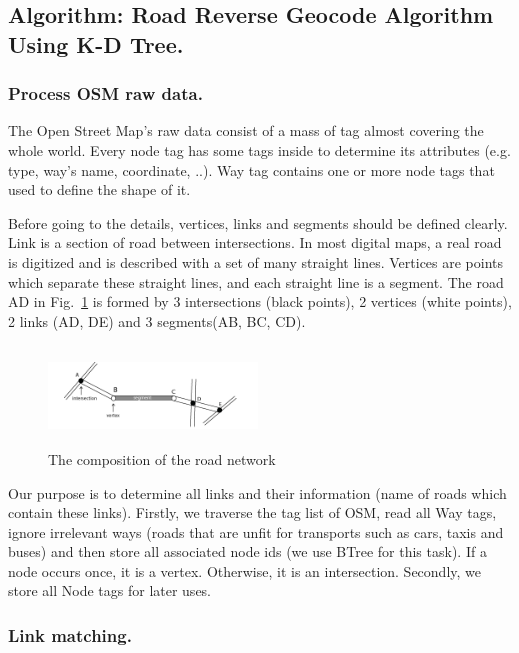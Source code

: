 \documentclass{acm_proc_article-sp}
\begin{document}
\subsection{Algorithm: Road Reverse Geocode Algorithm Using K-D Tree.}	
	
\subsubsection{Process OSM raw data.}
	The Open Street Map's raw data consist of a mass of tag almost covering the whole world. Every node tag has some tags inside to determine its attributes (e.g. type, way's name, coordinate, ..). Way tag contains one or more node tags that used to define the shape of it.
	
		\setlength{\parindent}{0.7cm} Before going to the details, vertices, links and segments should be defined clearly. Link is a section of road between intersections. In most digital maps, a real road is digitized and is described with a set of many straight lines. Vertices are points which separate these straight lines, and each straight line is a segment. The road AD in Fig.~\ref{fig:composition} is formed by 3 intersections (black points), 2 vertices (white points), 2 links (AD, DE) and 3 segments(AB, BC, CD).
		
\begin{figure}[h]
\centering
\includegraphics[height=100px,width=210px]{figure1}
\caption{The composition of the road network}
\label{fig:composition}
\end{figure}
	
		\setlength{\parindent}{0.7cm} Our purpose is to determine all links and their information (name of roads which contain these links). Firstly, we traverse the tag list of OSM, read all Way tags, ignore irrelevant ways (roads that are unfit for transports such as cars, taxis and buses) and then store all associated node ids (we use BTree for this task). If a node occurs once, it is a vertex. Otherwise, it is an intersection. Secondly, we store all Node tags for later uses.
	
\subsubsection{Link matching.}
	
\end{document}
